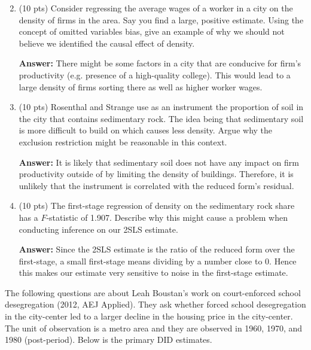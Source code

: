 \documentclass[12pt]{article}
\newcommand{\answer}[1]{{\color{blue_winged_teal}\textbf{Answer:} #1}}
\newcommand{\pts}[1]{{\color{zinc500}(#1 pts)}}
\begin{document}
\begin{enumerate}
  \setcounter{enumi}{1}
  \item \pts{10} Consider regressing the average wages of a worker in a city on the density of firms in the area. 
  Say you find a large, positive estimate.
  Using the concept of omitted variables bias, give an example of why we should not believe we identified the causal effect of density.

  \answer{
    There might be some factors in a city that are conducive for firm's productivity (e.g. presence of a high-quality college). 
    This would lead to a large density of firms sorting there as well as higher worker wages.
  }

  \medskip
  \item \pts{10} Rosenthal and Strange use as an instrument the proportion of soil in the city that contains sedimentary rock. 
  The idea being that sedimentary soil is more difficult to build on which causes less density. 
  Argue why the exclusion restriction might be reasonable in this context.

  \answer{
    It is likely that sedimentary soil does not have any impact on firm productivity outside of by limiting the density of buildings. 
    Therefore, it is unlikely that the instrument is correlated with the reduced form's residual.
  }

  \medskip
  \item \pts{10} The first-stage regression of density on the sedimentary rock share has a $F$-statistic of 1.907. 
  Describe why this might cause a problem when conducting inference on our 2SLS estimate.

  \answer{
    Since the 2SLS estimate is the ratio of the reduced form over the first-stage, a small first-stage means dividing by a number close to 0. 
    Hence this makes our estimate very sensitive to noise in the first-stage estimate.
  }
\end{enumerate}



\newpage
\noindent The following questions are about Leah Boustan's work on court-enforced school desegregation (2012, AEJ Applied).
They ask whether forced school desegregation in the city-center led to a larger decline in the housing price in the city-center.
The unit of observation is a metro area and they are observed in 1960, 1970, and 1980 (post-period).
Below is the primary DID estimates.
\end{document}
